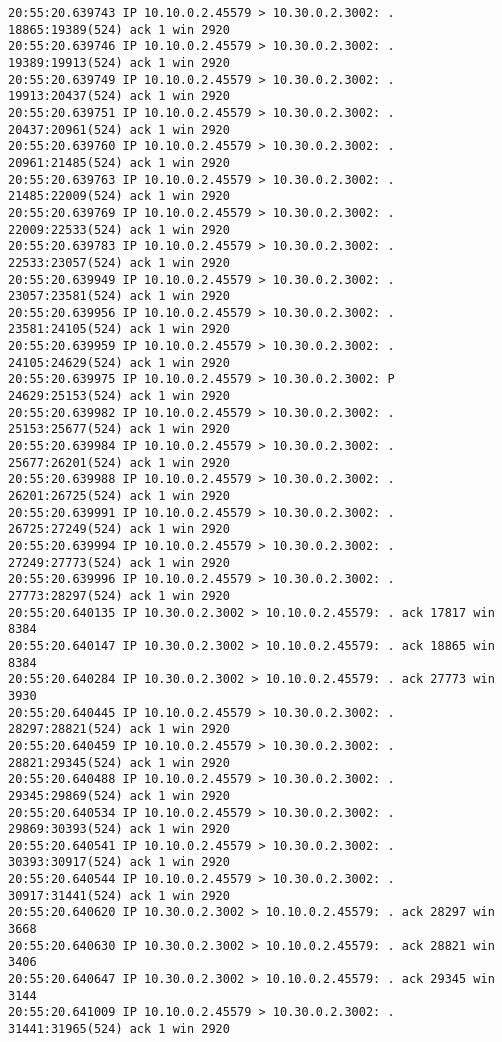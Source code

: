 \documentclass[a4paper,12pt]{article}
\begin{document}
\begin{Verbatim}
20:55:20.639743 IP 10.10.0.2.45579 > 10.30.0.2.3002: . 18865:19389(524) ack 1 win 2920
20:55:20.639746 IP 10.10.0.2.45579 > 10.30.0.2.3002: . 19389:19913(524) ack 1 win 2920
20:55:20.639749 IP 10.10.0.2.45579 > 10.30.0.2.3002: . 19913:20437(524) ack 1 win 2920
20:55:20.639751 IP 10.10.0.2.45579 > 10.30.0.2.3002: . 20437:20961(524) ack 1 win 2920
20:55:20.639760 IP 10.10.0.2.45579 > 10.30.0.2.3002: . 20961:21485(524) ack 1 win 2920
20:55:20.639763 IP 10.10.0.2.45579 > 10.30.0.2.3002: . 21485:22009(524) ack 1 win 2920
20:55:20.639769 IP 10.10.0.2.45579 > 10.30.0.2.3002: . 22009:22533(524) ack 1 win 2920
20:55:20.639783 IP 10.10.0.2.45579 > 10.30.0.2.3002: . 22533:23057(524) ack 1 win 2920
20:55:20.639949 IP 10.10.0.2.45579 > 10.30.0.2.3002: . 23057:23581(524) ack 1 win 2920
20:55:20.639956 IP 10.10.0.2.45579 > 10.30.0.2.3002: . 23581:24105(524) ack 1 win 2920
20:55:20.639959 IP 10.10.0.2.45579 > 10.30.0.2.3002: . 24105:24629(524) ack 1 win 2920
20:55:20.639975 IP 10.10.0.2.45579 > 10.30.0.2.3002: P 24629:25153(524) ack 1 win 2920
20:55:20.639982 IP 10.10.0.2.45579 > 10.30.0.2.3002: . 25153:25677(524) ack 1 win 2920
20:55:20.639984 IP 10.10.0.2.45579 > 10.30.0.2.3002: . 25677:26201(524) ack 1 win 2920
20:55:20.639988 IP 10.10.0.2.45579 > 10.30.0.2.3002: . 26201:26725(524) ack 1 win 2920
20:55:20.639991 IP 10.10.0.2.45579 > 10.30.0.2.3002: . 26725:27249(524) ack 1 win 2920
20:55:20.639994 IP 10.10.0.2.45579 > 10.30.0.2.3002: . 27249:27773(524) ack 1 win 2920
20:55:20.639996 IP 10.10.0.2.45579 > 10.30.0.2.3002: . 27773:28297(524) ack 1 win 2920
20:55:20.640135 IP 10.30.0.2.3002 > 10.10.0.2.45579: . ack 17817 win 8384
20:55:20.640147 IP 10.30.0.2.3002 > 10.10.0.2.45579: . ack 18865 win 8384
20:55:20.640284 IP 10.30.0.2.3002 > 10.10.0.2.45579: . ack 27773 win 3930
20:55:20.640445 IP 10.10.0.2.45579 > 10.30.0.2.3002: . 28297:28821(524) ack 1 win 2920
20:55:20.640459 IP 10.10.0.2.45579 > 10.30.0.2.3002: . 28821:29345(524) ack 1 win 2920
20:55:20.640488 IP 10.10.0.2.45579 > 10.30.0.2.3002: . 29345:29869(524) ack 1 win 2920
20:55:20.640534 IP 10.10.0.2.45579 > 10.30.0.2.3002: . 29869:30393(524) ack 1 win 2920
20:55:20.640541 IP 10.10.0.2.45579 > 10.30.0.2.3002: . 30393:30917(524) ack 1 win 2920
20:55:20.640544 IP 10.10.0.2.45579 > 10.30.0.2.3002: . 30917:31441(524) ack 1 win 2920
20:55:20.640620 IP 10.30.0.2.3002 > 10.10.0.2.45579: . ack 28297 win 3668
20:55:20.640630 IP 10.30.0.2.3002 > 10.10.0.2.45579: . ack 28821 win 3406
20:55:20.640647 IP 10.30.0.2.3002 > 10.10.0.2.45579: . ack 29345 win 3144
20:55:20.641009 IP 10.10.0.2.45579 > 10.30.0.2.3002: . 31441:31965(524) ack 1 win 2920

\end{Verbatim}
\end{document}
